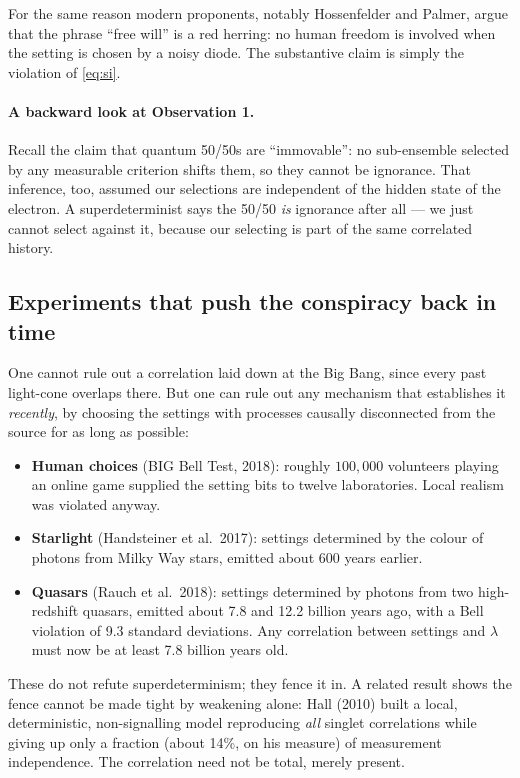 \documentclass[11pt,a4paper]{article}
\theoremstyle{remark}
\begin{document}
For the same reason modern proponents, notably Hossenfelder and Palmer, argue
that the phrase ``free will'' is a red herring: no human freedom is involved
when the setting is chosen by a noisy diode. The substantive claim is simply the
violation of \eqref{eq:si}.

\paragraph{A backward look at Observation 1.} Recall the claim that quantum
50/50s are ``immovable'': no sub-ensemble selected by any measurable criterion
shifts them, so they cannot be ignorance. That inference, too, assumed our
selections are independent of the hidden state of the electron. A
superdeterminist says the 50/50 \emph{is} ignorance after all --- we just
cannot select against it, because our selecting is part of the same
correlated history.

\subsection{Experiments that push the conspiracy back in time}

One cannot rule out a correlation laid down at the Big Bang, since every past
light-cone overlaps there. But one can rule out any mechanism that establishes
it \emph{recently}, by choosing the settings with processes causally
disconnected from the source for as long as possible:
\begin{itemize}[nosep]
 \item \textbf{Human choices} (BIG Bell Test, 2018): roughly $100{,}000$
       volunteers playing an online game supplied the setting bits to twelve
       laboratories. Local realism was violated anyway.
 \item \textbf{Starlight} (Handsteiner et al.\ 2017): settings determined by the
       colour of photons from Milky Way stars, emitted about 600 years
       earlier.
 \item \textbf{Quasars} (Rauch et al.\ 2018): settings determined by photons from
       two high-redshift quasars, emitted about 7.8 and 12.2 billion years ago,
       with a Bell violation of 9.3 standard deviations. Any correlation between
       settings and $\lambda$ must now be at least 7.8 billion years old.
\end{itemize}
These do not refute superdeterminism; they fence it in. A related result
shows the fence cannot be made tight by weakening alone: Hall (2010) built a
local, deterministic, non-signalling model reproducing \emph{all} singlet
correlations while giving up only a fraction (about 14\%, on his measure) of
measurement independence. The correlation need not be total, merely present.
\end{document}
